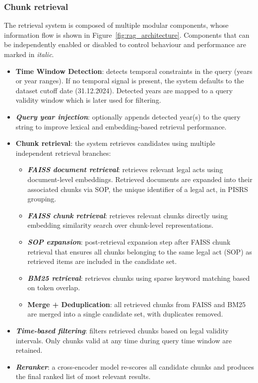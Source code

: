\documentclass[fleqn,moreauthors,10pt]{ds_report}
\begin{document}
\subsubsection*{Chunk retrieval}
The retrieval system is composed of multiple modular components, whose information flow is shown in Figure~\ref{fig:rag_architecture}. Components that can be independently enabled or disabled to control behaviour and performance are marked in \textit{italic}.
\begin{itemize}
    \itemsep0em
    \item \textbf{Time Window Detection}: detects temporal constraints in the query (years or year ranges). If no temporal signal is present, the system defaults to the dataset cutoff date (31.12.2024). Detected years are mapped to a query validity window which is later used for filtering.
    \item \textbf{\textit{Query year injection}}: optionally appends detected year(s) to the query string to improve lexical and embedding-based retrieval performance.
    \item \textbf{Chunk retrieval}: the system retrieves candidates using multiple independent retrieval branches:
    \begin{itemize}
        \itemsep0em
        \item \textbf{\textit{FAISS document retrieval}}: retrieves relevant legal acts using document-level embeddings. Retrieved documents are expanded into their associated chunks via SOP, the unique identifier of a legal act, in PISRS grouping.
        \item \textbf{\textit{FAISS chunk retrieval}}: retrieves relevant chunks directly using embedding similarity search over chunk-level representations.
        \item \textbf{\textit{SOP expansion}}: post-retrieval expansion step after FAISS chunk retrieval that ensures all chunks belonging to the same legal act (SOP) as retrieved items are included in the candidate set.
        \item \textbf{\textit{BM25 retrieval}}: retrieves chunks using sparse keyword matching based on token overlap.
        \item \textbf{Merge + Deduplication}: all retrieved chunks from FAISS and BM25 are merged into a single candidate set, with duplicates removed.
    \end{itemize}
    \item \textbf{\textit{Time-based filtering}}: filters retrieved chunks based on legal validity intervals. Only chunks valid at any time during query time window are retained.
    \item \textbf{\textit{Reranker}}: a cross-encoder model re-scores all candidate chunks and produces the final ranked list of most relevant results.
\end{itemize}
\end{document}
